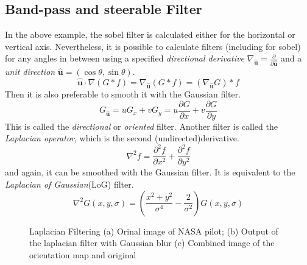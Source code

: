 \documentclass[twoside,a4paper,article]{combine}
\begin{document}
\subsection{Band-pass and steerable Filter}
In the above example, the sobel filter is calculated either for the horizontal or
vertical axis. Nevertheless, it is possible to calculate filters (including for sobel) for any angles in between using a specified 
\emph{directional derivative} $\nabla_{\boldsymbol{\hat{u}}} = \frac{\partial}{\partial\boldsymbol{\hat{u}}}$ 
and a \emph{unit direction} $\boldsymbol{\hat{u}} = (\cos \theta, \sin \theta)$\cite{Szeliski_2022}.
\[
    \boldsymbol{\hat{u}} \cdot \nabla (G \ast f) = \nabla_{\boldsymbol{\hat{u}}}(G \ast f) = (\nabla_{\boldsymbol{\hat{u}}}G) \ast  f
\]
Then it is also preferable to smooth it with the Gaussian filter.
\[
    G_{\boldsymbol{\hat{u}}} = u G_x + v G_y = u \frac{\partial G}{\partial x} + v \frac{\partial G}{\partial y} 
\]
This is called the \emph{directional} or \emph{oriented} filter.
Another filter is called the \emph{Laplacian operator}, which is the second (undirected)derivative.\cite{Szeliski_2022}
\[
    \nabla^2 f = \frac{\partial^2 f}{\partial x^2} + \frac{\partial^2 f}{\partial y^2}
\]
and again, it can be smoothed with the Gaussian filter. It is equivalent to the \emph{Laplacian of Gaussian}(LoG) filter.
\[
    \nabla^2 G (x, y, \sigma) = (\frac{x^2 + y^2}{\sigma^4} - \frac{2}{\sigma^2}) G (x, y, \sigma)
\]
\begin{minipage}{\textwidth}\begin{figure}[H]
    \centering
    \caption{Laplacian Filtering\cite{NASA_on_The_Commons_1970} (a) Orinal image of NASA pilot; (b) Output of the laplacian filter with Gaussian blur (c) Combined image of the orientation map and original}
    \label{fig:padding_borders}
\end{figure}\end{minipage}
\end{document}
